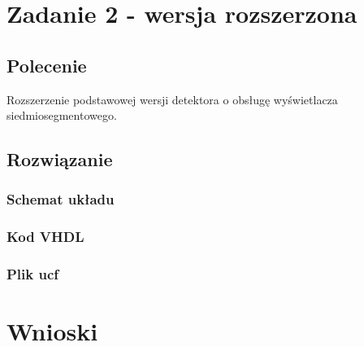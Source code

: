\documentclass[a4paper,12pt]{extarticle}  %
\begin{document}
\section{Zadanie 2 - wersja rozszerzona}
    \subsection{Polecenie}
    Rozszerzenie podstawowej wersji detektora o obsługę wyświetlacza siedmiosegmentowego.
    \subsection{Rozwiązanie}
        \subsubsection{Schemat układu}
        \begin{figure}[H]
            \centering
        \end{figure}
        \subsubsection{Kod VHDL}
        
        \subsubsection{Plik ucf}
        
\section{Wnioski}
\end{document}
